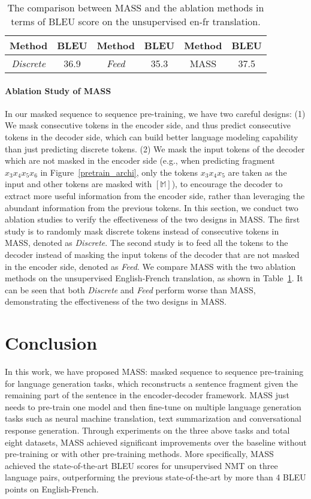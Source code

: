 \documentclass{article}
\begin{document}
	\begin{table}[!t]
		\small
		\centering
		\begin{tabular}{cc |cc|cc}
			\toprule
			Method & BLEU & Method & BLEU & Method & BLEU \\
			\midrule
			\textit{Discrete} & 36.9 & \textit{Feed} & 35.3 & MASS & 37.5  \\
			\bottomrule
		\end{tabular}
		\caption{The comparison between MASS and the ablation methods in terms of BLEU score on the unsupervised en-fr translation.}
		\label{tab_ablation}
	\end{table}
	
	\paragraph{Ablation Study of MASS}
	In our masked sequence to sequence pre-training, we have two careful designs: (1) We mask consecutive tokens in the encoder side, and thus predict consecutive tokens in the decoder side, which can build better language modeling capability than just predicting discrete tokens. (2) We mask the input tokens of the decoder which are not masked in the encoder side (e.g., when predicting fragment $x_3 x_4 x_5 x_6$ in Figure~\ref{pretrain_archi}, only the tokens $x_3 x_4 x_5$ are taken as the input and other tokens are masked with $[\mathbb{M}]$), to encourage the decoder to extract more useful information from the encoder side, rather than leveraging the abundant information from the previous tokens. In this section, we conduct two ablation studies to verify the effectiveness of the two designs in MASS. The first study is to randomly mask discrete tokens instead of consecutive tokens in MASS, denoted as \textit{Discrete}. The second study is to feed all the tokens to the decoder instead of masking the input tokens of the decoder that are not masked in the encoder side, denoted as \textit{Feed}. We compare MASS with the two ablation methods on the unsupervised English-French translation, as shown in Table~\ref{tab_ablation}. It can be seen that both \textit{Discrete} and \textit{Feed} perform worse than MASS, demonstrating the effectiveness of the two designs in MASS.
	
	\section{Conclusion}
	In this work, we have proposed MASS: masked sequence to sequence pre-training for language generation tasks, which reconstructs a sentence fragment given the remaining part of the sentence in the encoder-decoder framework. MASS just needs to pre-train one model and then fine-tune on multiple language generation tasks such as neural machine translation, text summarization and conversational response generation. Through experiments on the three above tasks and total eight datasets, MASS achieved significant improvements over the baseline without pre-training or with other pre-training methods. More specifically, MASS achieved the state-of-the-art BLEU scores for unsupervised NMT on three language pairs, outperforming the previous state-of-the-art by more than 4 BLEU points on English-French.
	
\end{document}
